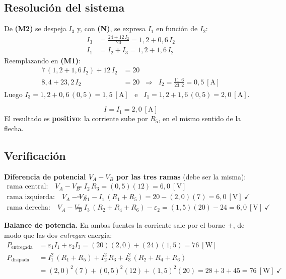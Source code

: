\documentclass[12pt,letterpaper]{article}
\begin{document}
\subsection*{Resoluci\'on del sistema}

De \textbf{(M2)} se despeja $I_3$ y, con \textbf{(N)}, se expresa $I_1$ en funci\'on de $I_2$:
\begin{align*}
    I_3 &= \frac{24 + 12\,I_2}{20} = 1{,}2 + 0{,}6\,I_2\\[2pt]
    I_1 &= I_2 + I_3 = 1{,}2 + 1{,}6\,I_2
\end{align*}
Reemplazando en \textbf{(M1)}:
\begin{align*}
    7\,(1{,}2 + 1{,}6\,I_2) + 12\,I_2 &= 20\\[2pt]
    8{,}4 + 23{,}2\,I_2 &= 20
    \;\;\Rightarrow\;\; I_2 = \frac{11{,}6}{23{,}2} = 0{,}5\ [\text{A}]
\end{align*}
Luego $I_3 = 1{,}2 + 0{,}6\,(0{,}5) = 1{,}5\ [\text{A}]$ \ e \ $I_1 = 1{,}2 + 1{,}6\,(0{,}5) = 2{,}0\ [\text{A}]$.

\[
    \boxed{I = I_1 = 2{,}0\ [\text{A}]}
\]
El resultado es \textbf{positivo}: la corriente sube por $R_5$, en el mismo sentido de la flecha.

\subsection*{Verificaci\'on}

\textbf{Diferencia de potencial $V_A - V_B$ por las tres ramas} (debe ser la misma):
\begin{align*}
    \text{rama central:}\quad   V_A - V_B &= I_2\,R_3 = (0{,}5)(12) = 6{,}0\ [\text{V}]\\[2pt]
    \text{rama izquierda:}\quad V_A - V_B &= \varepsilon_1 - I_1\,(R_1+R_5) = 20 - (2{,}0)(7) = 6{,}0\ [\text{V}]\ \checkmark\\[2pt]
    \text{rama derecha:}\quad   V_A - V_B &= I_3\,(R_2+R_4+R_6) - \varepsilon_2 = (1{,}5)(20) - 24 = 6{,}0\ [\text{V}]\ \checkmark
\end{align*}

\textbf{Balance de potencia.} En ambas fuentes la corriente sale por el borne $+$, de modo que
las dos \emph{entregan} energ\'ia:
\begin{align*}
    P_{\text{entregada}} &= \varepsilon_1 I_1 + \varepsilon_2 I_3 = (20)(2{,}0) + (24)(1{,}5) = 76\ [\text{W}]\\[2pt]
    P_{\text{disipada}}  &= I_1^2\,(R_1+R_5) + I_2^2\,R_3 + I_3^2\,(R_2+R_4+R_6)\\
                         &= (2{,}0)^2(7) + (0{,}5)^2(12) + (1{,}5)^2(20) = 28 + 3 + 45 = 76\ [\text{W}]\ \checkmark
\end{align*}
\end{document}
